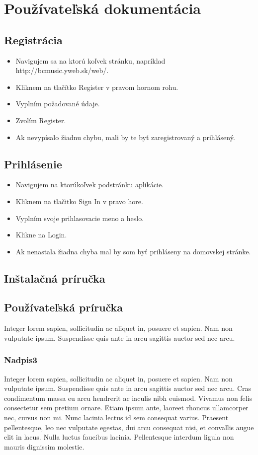 \newpage
\section{Používateľská dokumentácia}

\subsection{Registrácia}

\begin{itemize}
\item{Navigujem sa na ktorú koľvek stránku, napríklad http://bcmusic.yweb.sk/web/.}
\item{Kliknem na tlačítko Register v pravom hornom rohu.}
\item{Vyplním požadované údaje.}
\item{Zvolím Register.}
\item{Ak nevypísalo žiadnu chybu, mali by te byť zaregistrovaný a prihlásený.}
\end{itemize}

\subsection{Prihlásenie}

\begin{itemize}
\item{Navigujem na ktorúkoľvek podstránku aplikácie.}
\item{Kliknem na tlačitko Sign In v pravo hore.}
\item{Vyplním svoje prihlasovacie meno a heslo.}
\item{Klikne na Login.}
\item{Ak nenastala žiadna chyba mal by som byť prihláseny na domovskej stránke.}
\end{itemize}

\subsection{Inštalačná príručka}\label{install_guide}


\newpage
\subsection{Používateľská príručka}
Integer lorem sapien, sollicitudin ac aliquet in, posuere et sapien. Nam non vulputate ipsum. Suspendisse quis ante in arcu sagittis auctor sed nec arcu.

\subsubsection{Nadpis3}
Integer lorem sapien, sollicitudin ac aliquet in, posuere et sapien. Nam non vulputate ipsum. Suspendisse quis ante in arcu sagittis auctor sed nec arcu. Cras condimentum massa eu arcu hendrerit ac iaculis nibh euismod. Vivamus non felis consectetur sem pretium ornare. Etiam ipsum ante, laoreet rhoncus ullamcorper nec, cursus non mi. Nunc lacinia lectus id sem consequat varius. Praesent pellentesque, leo nec vulputate egestas, dui arcu consequat nisi, et convallis augue elit in lacus. Nulla luctus faucibus lacinia. Pellentesque interdum ligula non mauris dignissim molestie.

